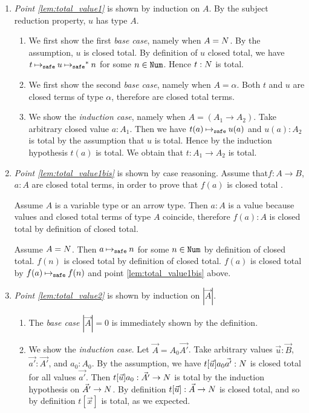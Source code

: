 \documentclass{article}
\newenvironment{proof}[1][Proof]{\begin{trivlist}
\item[\hskip \labelsep {\bfseries #1}]}{\end{trivlist}}
\begin{document}
\begin{proof}
\begin{enumerate}

\item
  \emph{Point \ref{lem:total_value1}} is shown by induction on $A$. 
By the subject reduction property, $u$ has type $A$.
\begin{enumerate}
\item
  We first show the first \emph{base case}, namely when $A ={N}$.
  By the assumption, $u$ is closed total.
  By definition of $u$ closed total, we have $t \mathbin{\mathbin{\mapsto}_{\hbox{\scriptsize \tt safe}}} u \mathbin{\mathbin{\mapsto}_{\hbox{\scriptsize \tt safe}}}^* n$ for some $n\in{\tt Num}$. 
  Hence $t:{N}$ is total.
\item
  We first show the second \emph{base case}, namely when $A =\alpha$.
  Both $t$ and $u$ are closed terms of type $\alpha$, therefore are closed total terms.
\item
  We show the \emph{induction case}, namely when $A = (A_1\rightarrow A_2)$.
  Take arbitrary closed value $a:A_1$. Then we have $t(a) \mathbin{\mathbin{\mapsto}_{\hbox{\scriptsize \tt safe}}} u(a)$ and 
  $u(a):A_2$ is total by the assumption that $u$ is total.
  Hence by the induction hypothesis $t(a)$ is total. 
  We obtain that $t:A_1\rightarrow A_2$ is total. 
\end{enumerate}

  \item
\emph{Point \ref{lem:total_value1bis}} is shown by case reasoning.
Assume that$f:A \rightarrow B$, $a:A$ are closed total terms, in order to prove
that $f(a)$  is closed total .

Assume $A$ is a variable type or an arrow type. 
Then $a:A$ is a value because values and closed total terms of type $A$
coincide, therefore $f(a):A$ is closed total by definition of closed total.

Assume $A={N}$. Then $a \mathbin{\mathbin{\mapsto}_{\hbox{\scriptsize \tt safe}}} n$ for some $n \in {\tt Num}$ by definition of closed total.
$f(n)$ is closed total by definition of closed total. $f(a)$ is closed total by $f(a) \mathbin{\mathbin{\mapsto}_{\hbox{\scriptsize \tt safe}}} f(n)$
and point \ref{lem:total_value1bis} above.

\item  
  \emph{Point \ref{lem:total_value2}} is shown by induction on $|\vec{A}|$.
\begin{enumerate}
\item
  The \emph{base case} $|\vec{A}| = 0$ is immediately shown by the definition.
\item
  We show the \emph{induction case}. Let $\vec{A} = A_0\vec{A'}$.
  Take arbitrary values $\vec{u}:\vec{B}$, $\vec{a'}:\vec{A'}$, and $a_0:A_0$. 
  By the assumption, we have $t[\vec{u}]a_0\vec{a'}:{N}$ is closed total for all values $\vec{a'}$. 
  Then $t[\vec{u}]a_0:\vec{A'}\rightarrow{N}$ is total 
  by the induction hypothesis on $\vec{A'}\rightarrow {N}$.
  By definition $t[\vec{u}]:\vec{A}\rightarrow{N}$ is closed total,
  and so by definition $t[\vec{x}]$ is total, as we expected.
\end{enumerate}

\end{enumerate}
\end{proof}
\end{document}
